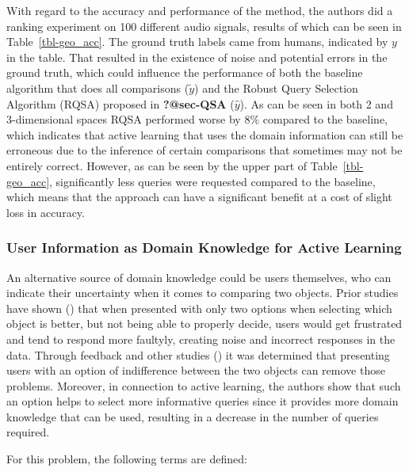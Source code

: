 \documentclass[
  letterpaper,
  numbers=noenddot,
  DIV=11]{scrreprt}
\theoremstyle{definition}
\theoremstyle{plain}
\theoremstyle{plain}
\theoremstyle{remark}
\begin{document}
With regard to the accuracy and performance of the method, the authors
did a ranking experiment on 100 different audio signals, results of
which can be seen in Table~\ref{tbl-geo_acc}. The ground truth labels
came from humans, indicated by \(y\) in the table. That resulted in the
existence of noise and potential errors in the ground truth, which could
influence the performance of both the baseline algorithm that does all
comparisons (\(\tilde{y}\)) and the Robust Query Selection Algorithm
(RQSA) proposed in \textbf{?@sec-QSA} (\(\hat{y}\)). As can be seen in
both 2 and 3-dimensional spaces RQSA performed worse by \(8\%\) compared
to the baseline, which indicates that active learning that uses the
domain information can still be erroneous due to the inference of
certain comparisons that sometimes may not be entirely correct. However,
as can be seen by the upper part of Table~\ref{tbl-geo_acc},
significantly less queries were requested compared to the baseline,
which means that the approach can have a significant benefit at a cost
of slight loss in accuracy.

\subsubsection*{User Information as Domain Knowledge for Active
Learning}\label{sec-geo_app}

An alternative source of domain knowledge could be users themselves, who
can indicate their uncertainty when it comes to comparing two objects.
Prior studies have shown () that when presented with only two options when selecting which
object is better, but not being able to properly decide, users would get
frustrated and tend to respond more faultyly, creating noise and
incorrect responses in the data. Through feedback and other studies
() it was
determined that presenting users with an option of indifference between
the two objects can remove those problems. Moreover, in connection to
active learning, the authors show that such an option helps to select
more informative queries since it provides more domain knowledge that
can be used, resulting in a decrease in the number of queries required.

For this problem, the following terms are defined:
\end{document}
